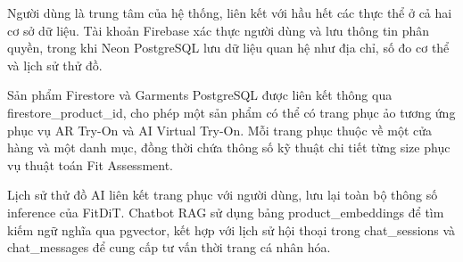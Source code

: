 Người dùng là trung tâm của hệ thống, liên kết với hầu hết
các thực thể ở cả hai cơ sở dữ liệu. Tài khoản Firebase
xác thực người dùng và lưu thông tin phân quyền, trong khi
Neon PostgreSQL lưu dữ liệu quan hệ như địa chỉ, số đo
cơ thể và lịch sử thử đồ.

Sản phẩm Firestore và Garments PostgreSQL được liên kết
thông qua firestore\_product\_id, cho phép một sản phẩm
có thể có trang phục ảo tương ứng phục vụ AR Try-On và
AI Virtual Try-On. Mỗi trang phục thuộc về một cửa hàng
và một danh mục, đồng thời chứa thông số kỹ thuật chi
tiết từng size phục vụ thuật toán Fit Assessment.

Lịch sử thử đồ AI liên kết trang phục với người dùng,
lưu lại toàn bộ thông số inference của FitDiT. Chatbot
RAG sử dụng bảng product\_embeddings để tìm kiếm ngữ
nghĩa qua pgvector, kết hợp với lịch sử hội thoại trong
chat\_sessions và chat\_messages để cung cấp tư vấn
thời trang cá nhân hóa.